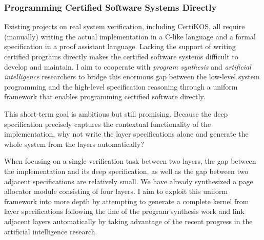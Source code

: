 \documentclass[a4paper, 10pt]{article}
\begin{document}
\begin{small}
\subsubsection*{\small Programming Certified Software Systems Directly}
Existing  projects on real system verification,
including CertiKOS, all require   (manually)  writing the actual implementation
 in a C-like language and a formal specification in a proof assistant language.
Lacking the support of  writing certified  programs  directly makes the certified  software systems difficult to develop and maintain. I aim to cooperate with \emph{program synthesis} 
and \emph{artificial intelligence} researchers to bridge this enormous gap between the low-level system programming and the high-level specification reasoning
through
a uniform framework that enables programming certified software directly.

This short-term goal is ambitious but still promising.
Because the deep specification
precisely captures the contextual functionality of the implementation, why not write the layer specifications alone
and generate the whole system from the layers automatically?
\begin{comment}
I plan to extend the CertiKOS
framework such that the layer specification can be smartly 
``compiled" into C programs that meet the specification
and the layers at different abstract level can be linked together in a mostly automated way.
\end{comment}
When focusing on a single verification task between two layers,
 the gap between the implementation and its deep specification, as well as the gap between two adjacent specifications
are relatively small.  We have already synthesized
a page allocator module consisting of four layers. 
I aim to  exploit this uniform framework into more depth by attempting to generate a complete kernel
 from layer specifications
following the line of the program synthesis work
and link adjacent layers automatically
by taking advantage of the recent progress in the
artificial intelligence research.


\end{small}
\end{document}
